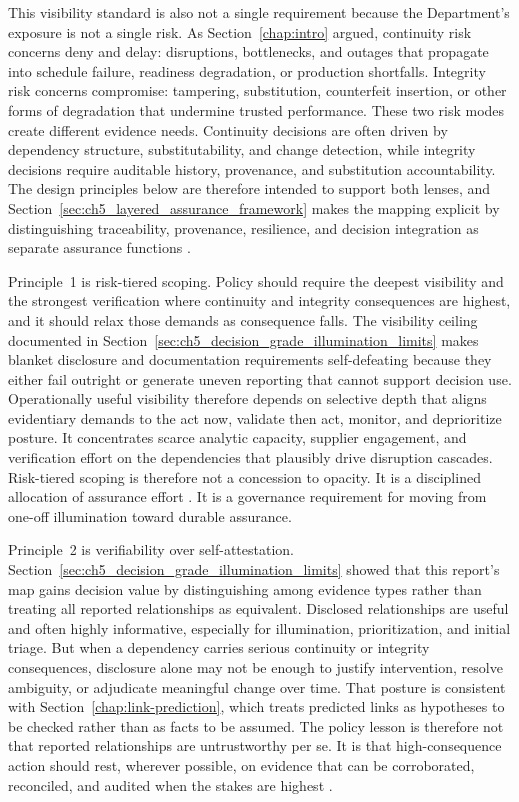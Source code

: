 This visibility standard is also not a single requirement because the Department's exposure is not a single risk. As Section~\ref{chap:intro} argued, continuity risk concerns deny and delay: disruptions, bottlenecks, and outages that propagate into schedule failure, readiness degradation, or production shortfalls. Integrity risk concerns compromise: tampering, substitution, counterfeit insertion, or other forms of degradation that undermine trusted performance. These two risk modes create different evidence needs. Continuity decisions are often driven by dependency structure, substitutability, and change detection, while integrity decisions require auditable history, provenance, and substitution accountability. The design principles below are therefore intended to support both lenses, and Section~\ref{sec:ch5_layered_assurance_framework} makes the mapping explicit by distinguishing traceability, provenance, resilience, and decision integration as separate assurance functions \parencite{ch5_dodi520044,ch5_dod2022_supplychains}.

Principle~1 is risk-tiered scoping. Policy should require the deepest visibility and the strongest verification where continuity and integrity consequences are highest, and it should relax those demands as consequence falls. The visibility ceiling documented in Section~\ref{sec:ch5_decision_grade_illumination_limits} makes blanket disclosure and documentation requirements self-defeating because they either fail outright or generate uneven reporting that cannot support decision use. Operationally useful visibility therefore depends on selective depth that aligns evidentiary demands to the act now, validate then act, monitor, and deprioritize posture. It concentrates scarce analytic capacity, supplier engagement, and verification effort on the dependencies that plausibly drive disruption cascades. Risk-tiered scoping is therefore not a concession to opacity. It is a disciplined allocation of assurance effort \parencite{ch5_nist800161r1upd1}. It is a governance requirement for moving from one-off illumination toward durable assurance.

Principle~2 is verifiability over self-attestation. Section~\ref{sec:ch5_decision_grade_illumination_limits} showed that this report's map gains decision value by distinguishing among evidence types rather than treating all reported relationships as equivalent. Disclosed relationships are useful and often highly informative, especially for illumination, prioritization, and initial triage. But when a dependency carries serious continuity or integrity consequences, disclosure alone may not be enough to justify intervention, resolve ambiguity, or adjudicate meaningful change over time. That posture is consistent with Section~\ref{chap:link-prediction}, which treats predicted links as hypotheses to be checked rather than as facts to be assumed. The policy lesson is therefore not that reported relationships are untrustworthy per se. It is that high-consequence action should rest, wherever possible, on evidence that can be corroborated, reconciled, and audited when the stakes are highest \parencite{ch5_nist800161r1upd1,ch5_dodi520044}.

